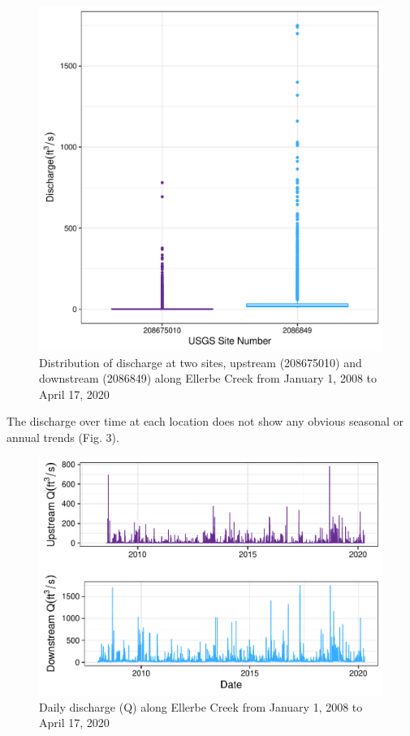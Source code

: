 \documentclass[12pt,]{article}
\begin{document}
\begin{figure}
\centering
\includegraphics{Landman_ENV872_Project_files/figure-latex/Exploratory Analysis Figure 2-1.pdf}
\caption{Distribution of discharge at two sites, upstream (208675010)
and downstream (2086849) along Ellerbe Creek from January 1, 2008 to
April 17, 2020}
\end{figure}

\newpage

The discharge over time at each location does not show any obvious
seasonal or annual trends (Fig. 3).

\begin{figure}
\centering
\includegraphics{Landman_ENV872_Project_files/figure-latex/Exploratory Analysis Figure 3-1.pdf}
\caption{Daily discharge (Q) along Ellerbe Creek from January 1, 2008 to
April 17, 2020}
\end{figure}
\end{document}
